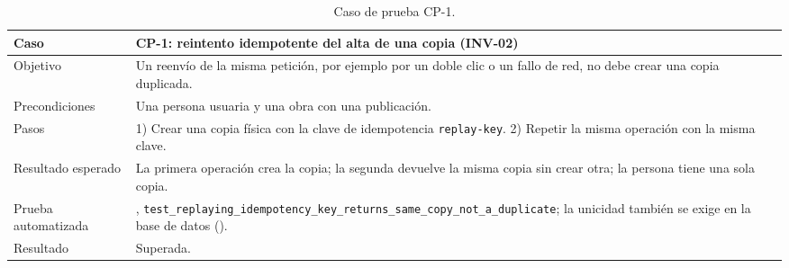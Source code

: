 \begin{table}[htp]
\centering
\small
\begin{tabularx}{\textwidth}{ | L{0.22\textwidth} | Y | }
    \hline
    \textbf{Caso} & \textbf{CP-1: reintento idempotente del alta de una copia (INV-02)} \\
    \hline
    Objetivo & Un reenvío de la misma petición, por ejemplo por un doble clic o un fallo de red, no debe crear una copia duplicada. \\
    \hline
    Precondiciones & Una persona usuaria y una obra con una publicación. \\
    \hline
    Pasos & 1) Crear una copia física con la clave de idempotencia \texttt{replay-key}. 2) Repetir la misma operación con la misma clave. \\
    \hline
    Resultado esperado & La primera operación crea la copia; la segunda devuelve la misma copia sin crear otra; la persona tiene una sola copia. \\
    \hline
    Prueba automatizada & , \texttt{test\_\allowbreak{}replaying\_\allowbreak{}idempotency\_\allowbreak{}key\_\allowbreak{}returns\_\allowbreak{}same\_\allowbreak{}copy\_\allowbreak{}not\_\allowbreak{}a\_\allowbreak{}duplicate}; la unicidad también se exige en la base de datos (). \\
    \hline
    Resultado & Superada. \\
    \hline
\end{tabularx}
\caption{Caso de prueba CP-1.}
\label{tab:pru-cp1}
\end{table}


